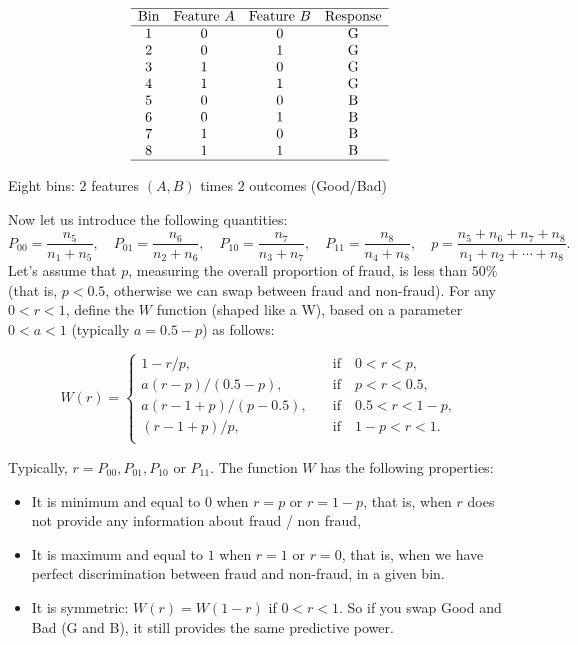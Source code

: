 \documentclass[oneside,10pt]{book}
\renewcommand{\arraystretch}{1.4} %
\begin{document}
\renewcommand{\arraystretch}{1.2} %
\begin{table}[H]
\small
\[
\begin{array}{cccc}
\hline
 \mbox{Bin} &  \text{Feature } A & \text{Feature } B & \text{Response} \\
\hline
 1  & 0 & 0 & \text{G} \\
2  & 0 & 1 & \text{G} \\
 3  & 1 & 0 & \text{G} \\
4  & 1 & 1 & \text{G} \\
5  & 0 & 0 & \text{B} \\
6  & 0 & 1 & \text{B} \\
 7  & 1 & 0 & \text{B}\\
8  & 1 & 1 & \text{B} \\
\hline
\end{array}
\]
\caption{\label{tabnbv45} Eight bins: $2$ features $(A, B)$ times $2$ outcomes (Good/Bad)}
\end{table}
\noindent Now let us introduce the following quantities:
$$
P_{00} = \frac{n_5}{n_1 + n_5}, \quad P_{01} = \frac{n_6}{n_2 + n_6}, \quad P_{10} = \frac{n_7}{n_3 + n_7}, \quad P_{11} = \frac{n_8}{n_4 + n_8},\quad 
p = \frac{n_5 + n_6 + n_7 + n_8}{n_1 + n_2 +\cdots + n_8}.
$$
Let’s assume that $p$, measuring the overall proportion of fraud, is less than $50\%$ (that is, $p < 0.5$, otherwise we can swap between fraud and non-fraud). For any 
$0<r<1$,  define the $W$ function (shaped like a W), based on a parameter $0<a<1$ (typically $a = 0.5 - p$) as follows:

\[   
W(r) = 
     \begin{cases}
       1 - r / p, &\quad\text{if }\text{ } 0 < r < p, \\
        a (r - p) / (0.5 - p), &\quad\text{if }\text{ } p < r < 0.5,\\
       a (r - 1 + p) / (p - 0.5),&\quad\text{if }\text{ } 0.5 < r < 1 - p,\\
       (r - 1 + p) / p, &\quad\text{if }\text{ }  1- p < r < 1.\\ 
     \end{cases}
\]
 
\noindent Typically, $r = P_{00}, P_{01}, P_{10}$ or $P_{11}$. The  function $W$ has the following properties:\vspace{1ex}
\begin{itemize}
	\item It is minimum and equal to $0$ when $r  = p$ or $r = 1 - p$, that is, when $r$ does not provide any information about fraud / non fraud,
	\item It is maximum and equal to $1$ when $r = 1$ or $r = 0$, that is, when we have perfect discrimination between fraud and non-fraud, in a given bin.
	\item It is symmetric: $W(r) = W(1 - r)$ if $0 < r < 1$. So if you swap Good and Bad (G and B), it still provides the same predictive power.
\end{itemize}\vspace{1ex}
\end{document}
